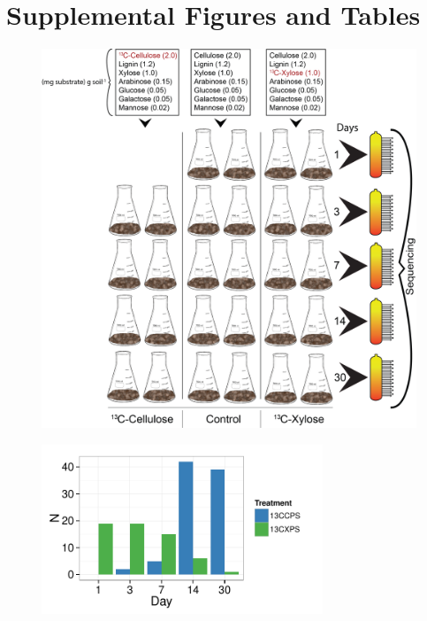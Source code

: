 \thispagestyle{empty}


\section{Supplemental Figures and Tables}

\begin{figure}[H]
	\begin{center}
	\centerline{\includegraphics[width=\textwidth]{figures/20150320methods_conceptual/20150320methods_conceptual.png}}
	\caption[Experimental Set Up]{\protect}\label{fig:setup}
        \end{center}
\end{figure}

\begin{figure}[H]
	\begin{center}
	\centerline{\includegraphics[width=0.75\textwidth]{figures/all_rspndr_bar/all_rspndr_bar.pdf}}
	\caption[Counts of $^{13}$C-responders at each day]{\protect}\label{fig:rspndr_count}
        \end{center}
\end{figure}

